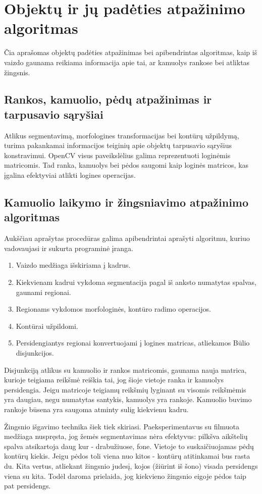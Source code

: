 \documentclass{VUMIFPSkursinis}
\begin{document}
\section{Objektų ir jų padėties atpažinimo algoritmas}
Čia aprašomas objektų padėties atpažinimas bei apibendrintas algoritmas, kaip iš vaizdo gaunama reikiama informacija apie tai, ar kamuolys rankose bei  atliktas žingsnis.
\subsection{Rankos, kamuolio, pėdų  atpažinimas ir tarpusavio sąryšiai}
Atlikus segmentavimą, morfologines transformacijas bei kontūrų užpildymą, turima pakankamai informacijos teiginių apie objektų tarpusavio sąryšius konstravimui.
OpenCV visus paveikslėlius galima reprezentuoti loginėmis matricomis. Tad ranka, kamuolys bei pėdos saugomi kaip loginės matricos, kas įgalina efektyviai atlikti logines operacijas.
\subsection{Kamuolio laikymo ir žingsniavimo atpažinimo algoritmas}
Aukščiau aprašytas procedūras galima apibendrintai aprašyti algoritmu, kuriuo vadovaujasi ir sukurta programinė įranga.
\begin{enumerate}
	\item Vaizdo medžiaga išskiriama į kadrus.  
	\item Kiekvienam kadrui vykdoma segmentacija pagal iš anksto numatytas spalvas, gaunami regionai. 
	\item Regionams vykdomos morfologinės, kontūro radimo operacijos.
	\item Kontūrai užpildomi.
	\item Persidengiantys regionai konvertuojami į logines matricas, atliekamos Būlio disjunkcijos.
\end{enumerate}

Disjunkciją atlikus su kamuolio ir rankos matricomis, gaunama nauja matrica, kurioje teigiama reikšmė reiškia tai, jog šioje vietoje ranka ir kamuolys persidengia. Jeigu matricoje teigiamų reikšmių lyginant su visomis reikšmėmis yra daugiau, negu numatytas santykis, kamuolys yra rankoje. Kamuolio buvimo rankoje būsena yra saugoma atminty sulig kiekvienu kadru.


Žingsnio išgavimo technika šiek tiek skiriasi. Paeksperimentavus su filmuota medžiaga nuspręsta, jog žemės segmentavimas nėra efektyvus: pilkšva aikštelių spalva atsikartoja daug kur - drabužiuose, fone. Vietoje to suskaičiuojamas pėdų kontūrų kiekis. Jeigu pėdos toli viena nuo kitos - kontūrų atitinkamai bus rasta du. Kita vertus, atliekant žingsnio judesį, kojos (žiūrint iš šono) visada persidengs viena su kita. Todėl daroma prielaida, jog kiekvieno žingsnio eigoje pėdos taip pat persidengs.
\end{document}
